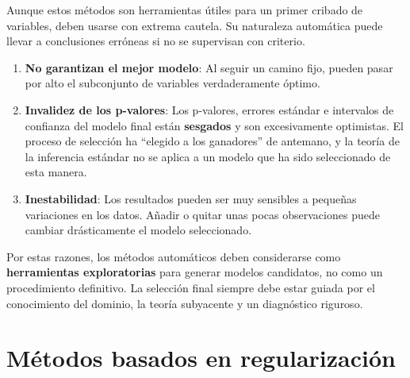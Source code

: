 \documentclass[
  letterpaper,
  DIV=11,
  numbers=noendperiod]{scrreprt}
\providecommand{\tightlist}{%
  \setlength{\itemsep}{0pt}\setlength{\parskip}{0pt}}
\begin{document}
\begin{tcolorbox}[enhanced jigsaw, leftrule=.75mm, breakable, colbacktitle=quarto-callout-warning-color!10!white, bottomrule=.15mm, colframe=quarto-callout-warning-color-frame, toprule=.15mm, colback=white, coltitle=black, bottomtitle=1mm, left=2mm, title=\textcolor{quarto-callout-warning-color}{\faExclamationTriangle}\hspace{0.5em}{Advertencia sobre los métodos automáticos}, opacityback=0, arc=.35mm, opacitybacktitle=0.6, toptitle=1mm, titlerule=0mm, rightrule=.15mm]

Aunque estos métodos son herramientas útiles para un primer cribado de
variables, deben usarse con extrema cautela. Su naturaleza automática
puede llevar a conclusiones erróneas si no se supervisan con criterio.

\begin{enumerate}
\def\labelenumi{\arabic{enumi}.}
\tightlist
\item
  \textbf{No garantizan el mejor modelo}: Al seguir un camino fijo,
  pueden pasar por alto el subconjunto de variables verdaderamente
  óptimo.
\item
  \textbf{Invalidez de los p-valores}: Los p-valores, errores estándar e
  intervalos de confianza del modelo final están \textbf{sesgados} y son
  excesivamente optimistas. El proceso de selección ha ``elegido a los
  ganadores'' de antemano, y la teoría de la inferencia estándar no se
  aplica a un modelo que ha sido seleccionado de esta manera.
\item
  \textbf{Inestabilidad}: Los resultados pueden ser muy sensibles a
  pequeñas variaciones en los datos. Añadir o quitar unas pocas
  observaciones puede cambiar drásticamente el modelo seleccionado.
\end{enumerate}

Por estas razones, los métodos automáticos deben considerarse como
\textbf{herramientas exploratorias} para generar modelos candidatos, no
como un procedimiento definitivo. La selección final siempre debe estar
guiada por el conocimiento del dominio, la teoría subyacente y un
diagnóstico riguroso.

\end{tcolorbox}

\section{Métodos basados en
regularización}\label{muxe9todos-basados-en-regularizaciuxf3n}
\end{document}
